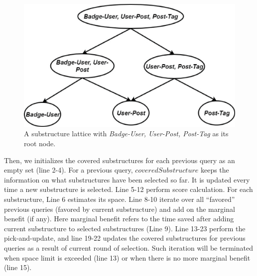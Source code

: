 \begin {figure}[h]
\centering
\includegraphics[scale=0.4]{pic/Structurelattice.eps}
\caption{A substructure lattice with \textit{Badge-User, User-Post, Post-Tag} as its root node.}
\label{fig:4:3}
\end{figure}


Then, we initializes the covered substructures for each previous query as an empty set (line 2-4). For a previous query, $coveredSubstructure$ keeps the information on what substructures have been selected so far. %
It is updated every time a new substructure is selected. Line 5-12 perform score calculation. For each substructure, Line 6 estimates its space. Line 8-10 iterate over all ``favored'' previous queries (favored by current substructure) and add on the marginal benefit (if any). Here marginal benefit refers to the time saved after adding current substructure to selected substructures (Line 9). Line 13-23 perform the pick-and-update, and line 19-22 updates the covered substructures for previous queries as a result of current round of selection. Such iteration will be terminated when space limit is exceeded (line 13) or when there is no more marginal benefit (line 15).

